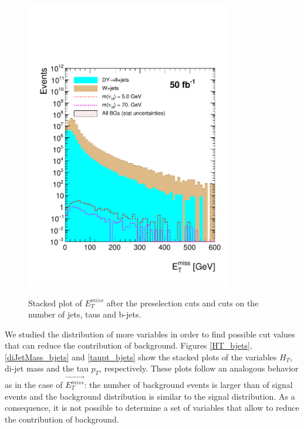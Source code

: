  \begin{figure}[h] 
 \centering
 \caption{Stacked plot of $E_T^{miss}$ after the preselection cuts and cuts on the number of jets, taus and b-jets.}
 \includegraphics[width=0.8\textwidth]{./Capitulos/Analysis/AfterBJets/MET_MET_20} 
 \label{MET_bjets}
 \end{figure}
 
We studied the distribution of more variables in order to find possible cut values that can reduce the contribution of background. Figures \ref{HT_bjets}, \ref{diJetMass_bjets} and \ref{taupt_bjets} show the stacked plots of the variables $H_T$, di-jet mass and the tau $p_T$, respectively. These plots follow an analogous behavior as in the case of $\vec{E_T^{miss}}$: the number of background events is larger than of signal events and the background distribution is similar to the signal distribution. As a consequence, it is not possible to determine a set of variables that allow to reduce the contribution of background.
 
